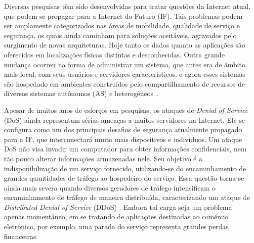 
Diversas pesquisas têm sido desenvolvidas para tratar questões da Internet atual, que podem se propagar para a Internet do Futuro (IF). Tais problemas podem ser amplamente categorizados nas áreas de mobilidade, qualidade de serviço e segurança, os quais ainda caminham para soluções aceitáveis, agravados pelo surgimento de novas arquiteturas. Hoje tanto os dados quanto as aplicações são oferecidos em localizações físicas distintas e desconhecidas. Outra grande mudança ocorreu na forma de administrar um sistema, que antes era de âmbito mais local, com seus usuários e servidores característicos, e agora esses sistemas são hospedado em ambientes construídos pelo compartilhamento de recursos de diversos sistemas autônomos (AS) e heterogêneos~\cite{5486552}.


Apesar de muitos anos de esforços em pesquisas, os ataques de \emph{Denial of Service} (DoS) ainda representam sérias ameaças a muitos servidores na Internet.  Ele se configura como um dos principais desafios de segurança atualmente propagado para a IF, que interconectará muito mais dispositivos e indivíduos.  %
Um ataque DoS não visa invadir um computador para obter informações confidenciais, nem tão pouco alterar informações armazenadas nele. Seu objetivo é a indisponibilização de um serviço fornecido, utilizando-se do encaminhamento de grandes quantidades de tráfego ao hospedeiro do serviço. %
Essa questão torna-se ainda mais severa quando diversos geradores de tráfego intensificam o encaminhamento de tráfego de maneira distribuída, caracterizando um ataque de \emph{Distributed Denial of Service} (DDoS) \cite{Sachdeva08ddosincidents}. 
%
Embora tal carga seja um problema apenas momentâneo, em se tratando de aplicações destinadas ao comércio eletrônico, por exemplo, uma parada do serviço representa grandes perdas financeiras. 

